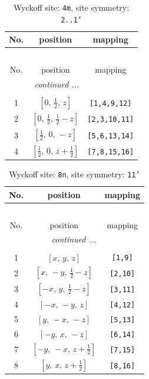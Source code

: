 \documentclass[fleqn,8pt]{jsarticle}
\begin{document}
\renewcommand{\arraystretch}{1.2}
\begin{longtable}{ccc}
\caption{Wyckoff site: {\tt 4m}, site symmetry: {\tt 2..1'}}
 \\
 \hline \hline
No. & position & mapping \\ \hline \endfirsthead

\multicolumn{2}{l}{\tablename\ \thetable{}} \\
 \hline \hline
No. & position & mapping \\ \hline \endhead

 \hline \hline
\multicolumn{2}{r}{\footnotesize\it continued ...} \\ \endfoot

 \hline \hline
\multicolumn{2}{r}{} \\ \endlastfoot

1 & $\left[ 0,\, \frac{1}{2},\, z \right]$ & {\tt [1,4,9,12]} \\ \hline
2 & $\left[ 0,\, \frac{1}{2},\, \frac{1}{2} - z \right]$ & {\tt [2,3,10,11]} \\ \hline
3 & $\left[ \frac{1}{2},\, 0,\, - z \right]$ & {\tt [5,6,13,14]} \\ \hline
4 & $\left[ \frac{1}{2},\, 0,\, z + \frac{1}{2} \right]$ & {\tt [7,8,15,16]} \\
\end{longtable}
\renewcommand{\arraystretch}{1.2}
\begin{longtable}{ccc}
\caption{Wyckoff site: {\tt 8n}, site symmetry: {\tt 11'}}
 \\
 \hline \hline
No. & position & mapping \\ \hline \endfirsthead

\multicolumn{2}{l}{\tablename\ \thetable{}} \\
 \hline \hline
No. & position & mapping \\ \hline \endhead

 \hline \hline
\multicolumn{2}{r}{\footnotesize\it continued ...} \\ \endfoot

 \hline \hline
\multicolumn{2}{r}{} \\ \endlastfoot

1 & $\left[ x,\, y,\, z \right]$ & {\tt [1,9]} \\ \hline
2 & $\left[ x,\, - y,\, \frac{1}{2} - z \right]$ & {\tt [2,10]} \\ \hline
3 & $\left[ - x,\, y,\, \frac{1}{2} - z \right]$ & {\tt [3,11]} \\ \hline
4 & $\left[ - x,\, - y,\, z \right]$ & {\tt [4,12]} \\ \hline
5 & $\left[ y,\, - x,\, - z \right]$ & {\tt [5,13]} \\ \hline
6 & $\left[ - y,\, x,\, - z \right]$ & {\tt [6,14]} \\ \hline
7 & $\left[ - y,\, - x,\, z + \frac{1}{2} \right]$ & {\tt [7,15]} \\ \hline
8 & $\left[ y,\, x,\, z + \frac{1}{2} \right]$ & {\tt [8,16]} \\
\end{longtable}
\end{document}
